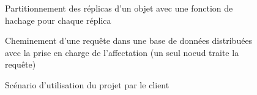 \documentclass[12pt]{article}
\begin{document}
\begin{figure}[p]
	\centering
		
	\caption{Partitionnement des réplicas d'un objet avec une fonction de hachage pour chaque réplica\label{fig:multi_hash_partitionning}}
\end{figure}

\begin{figure}[p]
	\centering
		
	\caption{Cheminement d'une requête dans une base de données distribuées avec la prise en charge de l'affectation (un seul noeud traite la requête)\label{fig:request}}
\end{figure}

\begin{figure}[p]
	\centering
		
	\caption{Scénario d'utilisation du projet par le client\label{fig:user_scenario}}
\end{figure}


\end{document}
